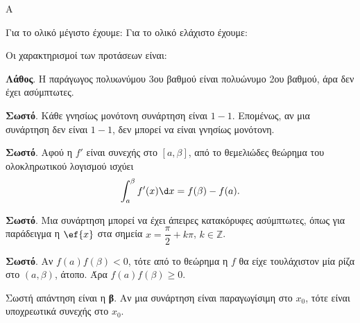 \begin{thema}{Α}
\begin{erwthma}
\item {}

\item Για το ολικό μέγιστο έχουμε:
Για το ολικό ελάχιστο έχουμε:

\item {}

\item Οι χαρακτηρισμοί των προτάσεων είναι:
\begin{alist}
\item \textbf{Λάθος}. Η παράγωγος πολυωνύμου 3ου βαθμού είναι πολυώνυμο 2ου βαθμού, άρα δεν έχει ασύμπτωτες.
\item \textbf{Σωστό}. Κάθε γνησίως μονότονη συνάρτηση είναι $1-1$. Επομένως, αν μια συνάρτηση δεν είναι $1-1$, δεν μπορεί να είναι γνησίως μονότονη.
\item \textbf{Σωστό}. Αφού η $f'$ είναι συνεχής στο $[a,\beta]$, από το θεμελιώδες θεώρημα του ολοκληρωτικού λογισμού ισχύει
\[ \dint_a^\beta f'(x)\d x=f(\beta)-f(a). \]
\item \textbf{Σωστό}. Μια συνάρτηση μπορεί να έχει άπειρες κατακόρυφες ασύμπτωτες, όπως για παράδειγμα η $\ef{x}$ στα σημεία $x=\dfrac{\pi}{2}+k\pi$, $k\in\mathbb{Z}$.
\item \textbf{Σωστό}. Αν $f(a)f(\beta)<0$, τότε από το θεώρημα  η $f$ θα είχε τουλάχιστον μία ρίζα στο $(a,\beta)$, άτοπο. Άρα $f(a)f(\beta)\ge0$.
\end{alist}

\item Σωστή απάντηση είναι η \textbf{β}. Αν μια συνάρτηση είναι παραγωγίσιμη στο $x_0$, τότε είναι υποχρεωτικά συνεχής στο $x_0$.
\end{erwthma}
\end{thema}

